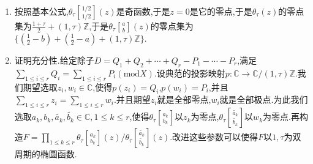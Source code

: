 \begin{enumerate}
\begin{proof}
    	记$\gamma$为$z_0$到$z_0+1$的直线段,那么$\theta_{\tau}(z)$在$\Pi_{z_0}$的零点个数为:
    	\begin{align*}
    	&=\frac{1}{2\pi i}\int_{\partial Pi_{z_0}}\left(\frac{\theta_{\tau}'}{\theta_{\tau}}\right)(z)\mathrm{d}z=\frac{1}{2\pi i}\left(\int_{\gamma}-\int_{\gamma+\tau}\right)\\&=\frac{1}{2\pi i}\int_{\gamma}\left(\left(\frac{\theta_{\tau}'}{\theta_{\tau}}\right)(z)-\left(\left(\frac{\theta_{\tau}'}{\theta_{\tau}}\right)(z)-2\pi i\right)\right)\mathrm{d}z=1
    	\end{align*}
    \end{proof}
    \item 按照基本公式,$\theta_{\tau}\genfrac{[}{]}{0pt}{}{1/2}{1/2}(z)$是奇函数,于是$z=0$是它的零点,于是$\theta_{\tau}(z)$的零点集为$\frac{1+\tau}{2}+(1,\tau)\mathbb{Z}$,于是$\theta_{\tau}\genfrac{[}{]}{0pt}{}{a}{b}(z)$的零点集为$\{(\frac{1}{2}-b)+(\frac{1}{2}-a)+(1,\tau)\mathbb{Z}\}$.
    \item 证明充分性.给定除子$D=Q_1+Q_2+\cdots+Q_r-P_1-\cdots-P_r$,满足$\sum_{1\le i\le r}Q_i=\sum_{1\le i\le r}P_i(\mathrm{mod}X)$.设典范的投影映射$p:\mathbb{C}\to\mathbb{C}/(1,\tau)\mathbb{Z}$.我们期望选取$z_i,w_i\in\mathbb{C}$,使得$p(z_i)=Q_i$,$p(w_i)=P_i$,并且$\sum_{1\le i\le r}z_i=\sum_{1\le i\le r}w_i$.并且期望$z_i$就是全部零点,$w_i$就是全部极点.为此我们选取$a_k,b_k,\widetilde{a_k},\widetilde{b_k}\in\mathbb{C},1\le k\le r$,使得$\theta_{\tau}\genfrac{[}{]}{0pt}{}{a_k}{b_k}$以$z_k$为零点,$\theta_{\tau}\genfrac{[}{]}{0pt}{}{\widetilde{a_k}}{\widetilde{b_k}}$以$w_k$为零点.再构造$F=\prod_{1\le k\le r}\theta_{\tau}\genfrac{[}{]}{0pt}{}{a_k}{b_k}(z)/\theta_{\tau}\genfrac{[}{]}{0pt}{}{\widetilde{a_k}}{\widetilde{b_k}}(z)$.改进这些参数可以使得$F$以$1,\tau$为双周期的椭圆函数.
\end{enumerate}



















